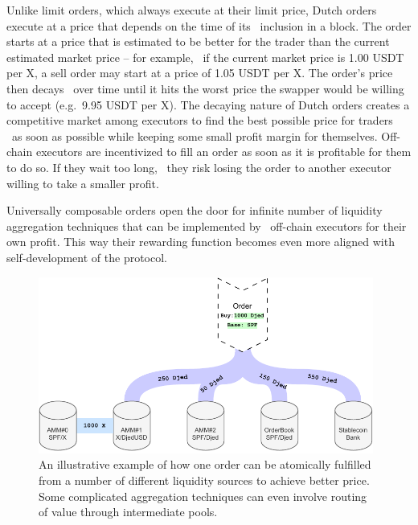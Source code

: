 \documentclass[11pt]{article}
\begin{document}
\begin{sloppypar}
        \newpage
        Unlike limit orders, which always execute at their limit price, Dutch orders execute at a price that depends on the time of its \
        inclusion in a block.
        The order starts at a price that is estimated to be better for the trader than the current estimated market price -- for example, \
        if the current market price is 1.00 USDT per X, a sell order may start at a price of 1.05 USDT per X. The order’s price then decays \
        over time until it hits the worst price the swapper would be willing to accept (e.g.\ 9.95 USDT per X).
        The decaying nature of Dutch orders creates a competitive market among executors to find the best possible price for traders \
        as soon as possible while keeping some small profit margin for themselves.
        Off-chain executors are incentivized to fill an order as soon as it is profitable for them to do so. If they wait too long, \
        they risk losing the order to another executor willing to take a smaller profit.

        \newpage
        Universally composable orders open the door for infinite number of liquidity aggregation techniques that can be implemented by \
        off-chain executors for their own profit.
        This way their rewarding function becomes even more aligned with self-development of the protocol.

        \begin{figure}[h!]
            \centering
            \includegraphics[width=0.98\textwidth]{order_composition}
            \caption{An illustrative example of how one order can be atomically fulfilled from a number of
            different liquidity sources to achieve better price. Some complicated aggregation techniques
            can even involve routing of value through intermediate pools.}
            \label{fig:figure4}
        \end{figure}


\end{sloppypar}
\end{document}
